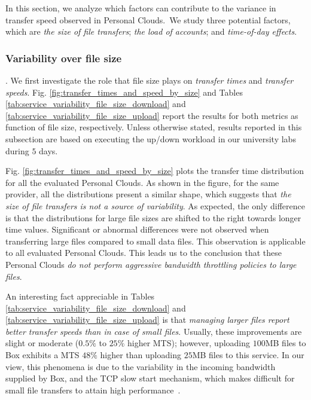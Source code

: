 In this section, we analyze which factors can contribute to the
variance in transfer speed observed in Personal Clouds.~We
study three potential factors, which are \textit{the size of file transfers};
\textit{the load of accounts}; and \textit{time-of-day effects}.
\medskip

\subsubsection*{Variability over file size}.
We first investigate the role that 
file size plays on \textit{transfer times} 
and \textit{transfer speeds}. Fig. \ref{fig:transfer_times_and_speed_by_size}
and Tables \ref{tab:service_variability_file_size_download} and \ref{tab:service_variability_file_size_upload} report the results
for both metrics as function of file size, respectively. Unless otherwise
stated, results reported in this subsection are based on executing the 
up/down workload in our university labs during $5$ days.  

Fig. \ref{fig:transfer_times_and_speed_by_size} plots the
transfer time distribution for all the evaluated
Personal Clouds. As shown in the figure, for
the same provider, all the distributions present a similar
shape, which suggests that \textit{the size of file transfers is not a 
source of variability}. As expected, the only difference is that
the distributions for large file sizes are shifted to the right towards
longer time values. Significant or abnormal differences were not observed
when transferring large files compared to small data files. This observation is applicable to all evaluated Personal Clouds. 
This leads us to the conclusion that these Personal Clouds
\textit{do not perform aggressive bandwidth throttling policies to large files}.

An interesting fact appreciable in Tables \ref{tab:service_variability_file_size_download} and \ref{tab:service_variability_file_size_upload}
is that \textit{managing larger files report better transfer 
speeds than in case of small files}. Usually, these 
improvements are slight or moderate ($0.5\%$ to $25\%$ higher MTS); 
however, uploading $100$MB files to Box exhibits a MTS $48\%$ higher
than uploading $25$MB files to this service. In our view, this phenomena is due
to the variability in the incoming bandwidth supplied by Box, and 
the TCP slow start mechanism, which makes difficult for small file transfers 
to attain high performance~\cite{allman1999tcp}. 

